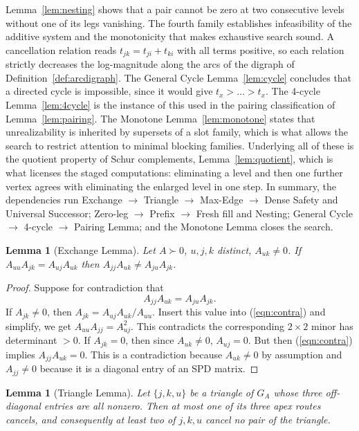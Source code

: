 \documentclass[11pt]{article}
\theoremstyle{plain}
\newtheorem{lemma}[theorem]{Lemma}
\theoremstyle{definition}
\begin{document}
\begin{humanblock}
Lemma~\ref{lem:nesting} shows that a pair cannot be zero at two consecutive levels without one of its legs vanishing. The fourth family establishes infeasibility of the additive system and the monotonicity that makes exhaustive search sound. A cancellation relation reads $t_{jk}=t_{ji}+t_{ki}$ with all terms positive, so each relation strictly decreases the log-magnitude along the arcs of the digraph of Definition~\ref{def:arcdigraph}. The General Cycle Lemma~\ref{lem:cycle} concludes that a directed cycle is impossible, since it would give $t_x>\dots>t_x$. The 4-cycle Lemma~\ref{lem:4cycle} is the instance of this used in the pairing classification of Lemma~\ref{lem:pairing}. The Monotone Lemma~\ref{lem:monotone} states that unrealizability is inherited by supersets of a slot family, which is what allows the search to restrict attention to minimal blocking families. Underlying all of these is the quotient property of Schur complements, Lemma~\ref{lem:quotient}, which is what licenses the staged computations: eliminating a level and then one further vertex agrees with eliminating the enlarged level in one step. In summary, the dependencies run Exchange $\to$ Triangle $\to$ Max-Edge $\to$ Dense Safety and Universal Successor; Zero-leg $\to$ Prefix $\to$ Fresh fill and Nesting; General Cycle $\to$ 4-cycle $\to$ Pairing Lemma; and the Monotone Lemma closes the search.

\begin{lemma}[Exchange Lemma]\label{lem:exchange}
Let $A\succ0$, $u,j,k$ distinct, $A_{uk}\neq0$. If $A_{uu}A_{jk}=A_{uj}A_{uk}$ then $A_{jj}A_{uk}\neq A_{ju}A_{jk}$.
\end{lemma}
\begin{proof}
Suppose for contradiction that
\begin{equation}\label{eqn:contra}
A_{jj}A_{uk} = A_{ju}A_{jk}.
\end{equation}
If $A_{jk}\neq0$, then $A_{jk}=A_{uj}A_{uk}/A_{uu}$. Insert this value into (\ref{eqn:contra}) and simplify, we get $A_{uu}A_{jj}=A_{uj}^2$. This contradicts the corresponding $2\times2$ minor has determinant $>0$. If $A_{jk}=0$, then since $A_{uk}\neq 0$, $A_{uj}=0$. But then (\ref{eqn:contra}) implies $A_{jj}A_{uk}=0$. This is a contradiction because $A_{uk}\neq 0$ by assumption and $A_{jj}\neq 0$ because it is a diagonal entry of an SPD matrix.
\end{proof}

\begin{lemma}[Triangle Lemma]\label{lem:tri}
Let $\{j,k,u\}$ be a triangle of $G_A$ whose three off-diagonal entries are all nonzero. Then at most
one of its three apex routes cancels, and consequently at least two of $j,k,u$ cancel no pair of the
triangle.
\end{lemma}


\end{humanblock}
\end{document}

